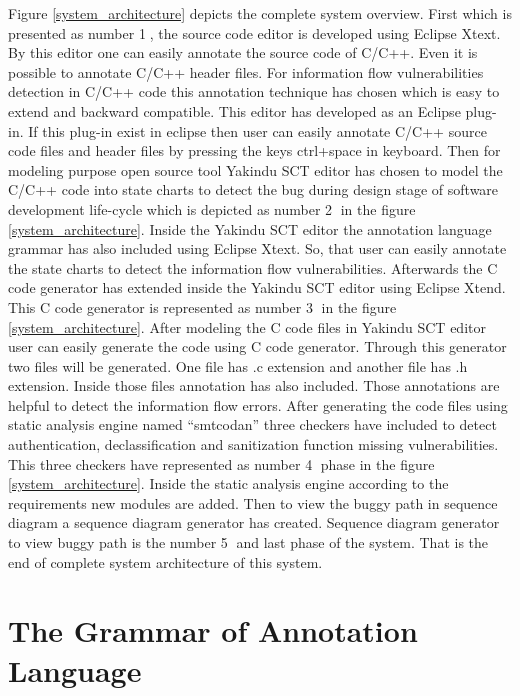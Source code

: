 Figure \ref{system_architecture} depicts the complete system overview. First which is presented as number \textcircled{1}, the source code editor is developed using Eclipse Xtext. By this editor one can easily annotate the source code of C/C++. Even it is possible to annotate C/C++ header files. For information flow vulnerabilities detection in C/C++ code this annotation technique has chosen which is easy to extend and backward compatible. This editor has developed as an Eclipse plug-in. If this plug-in exist in eclipse then user can easily annotate C/C++ source code files and header files by pressing the keys ctrl+space in keyboard. Then for modeling purpose open source tool Yakindu SCT editor \cite{ref_15_yakindu:sct} has chosen to model the C/C++ code into state charts to detect the bug during design stage of software development life-cycle which is depicted as number \textcircled{2} in the figure \ref{system_architecture}. Inside the Yakindu SCT editor the annotation language grammar has also included using Eclipse Xtext. So, that user can easily annotate the state charts to detect the information flow vulnerabilities. Afterwards the C code generator has extended inside the Yakindu SCT editor using Eclipse Xtend. This C code generator is represented as number \textcircled{3} in the figure \ref{system_architecture}. After modeling the C code files in Yakindu SCT editor user can easily generate the code using C code generator. Through this generator two files will be generated. One file has .c extension and another file has .h extension. Inside those files annotation has also included. Those annotations are helpful to detect the information flow errors. After generating the code files using static analysis engine named \enquote{smtcodan} three checkers have included to detect authentication, declassification and sanitization function missing vulnerabilities. This three checkers have represented as number \textcircled{4} phase in the figure \ref{system_architecture}. Inside the static analysis engine according to the requirements new modules are added. Then to view the buggy path in sequence diagram a sequence diagram generator has created. Sequence diagram generator to view buggy path is the number \textcircled{5} and last phase of the system. That is the end of complete system architecture of this system. 


\section{The Grammar of Annotation Language}

